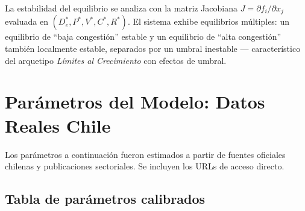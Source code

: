 \documentclass[12pt,a4paper]{article}
\begin{document}
La estabilidad del equilibrio se analiza con la matriz Jacobiana
$J = \partial f_i / \partial x_j$ evaluada en $(D_e^*, P^*, V^*, C^*, R^*)$.
El sistema exhibe equilibrios múltiples: un equilibrio de ``baja congestión''
estable y un equilibrio de ``alta congestión'' también localmente estable,
separados por un umbral inestable — característico del arquetipo
\textit{Límites al Crecimiento} con efectos de umbral.

\section{Parámetros del Modelo: Datos Reales Chile}

\begin{databox}
Los parámetros a continuación fueron estimados a partir de fuentes
oficiales chilenas y publicaciones sectoriales. Se incluyen los URLs
de acceso directo.
\end{databox}

\subsection{Tabla de parámetros calibrados}
\end{document}

